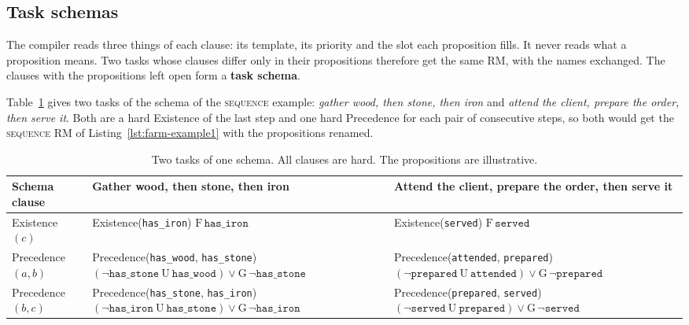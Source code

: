 \documentclass[11pt,english,listoffigures,listoftables]{tfgetsinf}
\newcommand{\runex}[1]{\textsc{#1}}  %
\begin{document}
\subsection{Task schemas}
\label{sec:task-schemas}
The compiler reads three things of each clause: its template, its priority and the slot each proposition fills. It never reads what a proposition means. Two tasks whose clauses differ only in their propositions therefore get the same RM, with the names exchanged. The clauses with the propositions left open form a \textbf{task schema}.

Table~\ref{tab:schemas} gives two tasks of the schema of the \runex{sequence} example: \textit{gather wood, then stone, then iron} and \textit{attend the client, prepare the order, then serve it}. Both are a hard Existence of the last step and one hard Precedence for each pair of consecutive steps, so both would get the \runex{sequence} RM of Listing~\ref{lst:farm-example1} with the propositions renamed.

\begin{table}[H]
\centering
\footnotesize
\renewcommand{\arraystretch}{1.2}
\begin{tabularx}{\textwidth}{@{}>{\raggedright\arraybackslash}p{3.2cm}>{\raggedright\arraybackslash}X>{\raggedright\arraybackslash}X@{}}
\toprule
\textbf{Schema clause} & \textbf{Gather wood, then stone, then iron} & \textbf{Attend the client, prepare the order, then serve it} \\ \midrule
Existence$(c)$ & Existence(\texttt{has\_iron}) \newline $\mathrm{F}\,\texttt{has\_iron}$ & Existence(\texttt{served}) \newline $\mathrm{F}\,\texttt{served}$ \\
Precedence$(a,b)$ & Precedence(\texttt{has\_wood}, \texttt{has\_stone}) \newline $(\neg\texttt{has\_stone}\ \mathrm{U}\ \texttt{has\_wood}) \lor \mathrm{G}\,\neg\texttt{has\_stone}$ & Precedence(\texttt{attended}, \texttt{prepared}) \newline $(\neg\texttt{prepared}\ \mathrm{U}\ \texttt{attended}) \lor \mathrm{G}\,\neg\texttt{prepared}$ \\
Precedence$(b,c)$ & Precedence(\texttt{has\_stone}, \texttt{has\_iron}) \newline $(\neg\texttt{has\_iron}\ \mathrm{U}\ \texttt{has\_stone}) \lor \mathrm{G}\,\neg\texttt{has\_iron}$ & Precedence(\texttt{prepared}, \texttt{served}) \newline $(\neg\texttt{served}\ \mathrm{U}\ \texttt{prepared}) \lor \mathrm{G}\,\neg\texttt{served}$ \\ \bottomrule
\end{tabularx}
\caption{Two tasks of one schema. All clauses are hard. The propositions are illustrative.}
\label{tab:schemas}
\end{table}
\end{document}
